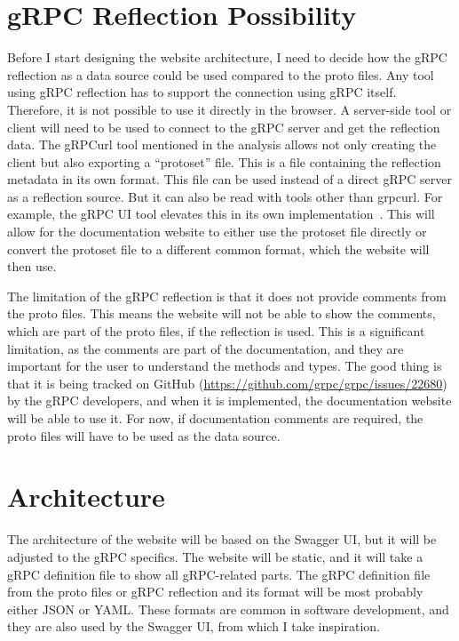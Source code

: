 \section{gRPC Reflection Possibility}
Before I start designing the website architecture, I need to decide how the gRPC reflection as a data source could be used compared to the proto files.
Any tool using gRPC reflection has to support the connection using gRPC itself.
Therefore, it is not possible to use it directly in the browser.
A server-side tool or client will need to be used to connect to the gRPC server and get the reflection data.
The gRPCurl tool mentioned in the analysis allows not only creating the client but also exporting a \enquote{protoset} file.
This is a file containing the reflection metadata in its own format.
This file can be used instead of a direct gRPC server as a reflection source.
But it can also be read with tools other than grpcurl.
For example, the gRPC UI tool elevates this in its own implementation~\cite{grpc-grpcui}.
This will allow for the documentation website to either use the protoset file directly or convert the protoset file to a different common format, which the website will then use.

The limitation of the gRPC reflection is that it does not provide comments from the proto files.
This means the website will not be able to show the comments, which are part of the proto files, if the reflection is used.
This is a significant limitation, as the comments are part of the documentation, and they are important for the user to understand the methods and types.
The good thing is that it is being tracked on GitHub (\url{https://github.com/grpc/grpc/issues/22680}) by the gRPC developers, and when it is implemented, the documentation website will be able to use it.
For now, if documentation comments are required, the proto files will have to be used as the data source.


\section{Architecture}
The architecture of the website will be based on the Swagger UI, but it will be adjusted to the gRPC specifics.
The website will be static, and it will take a gRPC definition file to show all gRPC-related parts.
The gRPC definition file from the proto files or gRPC reflection and its format will be most probably either JSON or YAML\@.
These formats are common in software development, and they are also used by the Swagger UI, from which I take inspiration.


